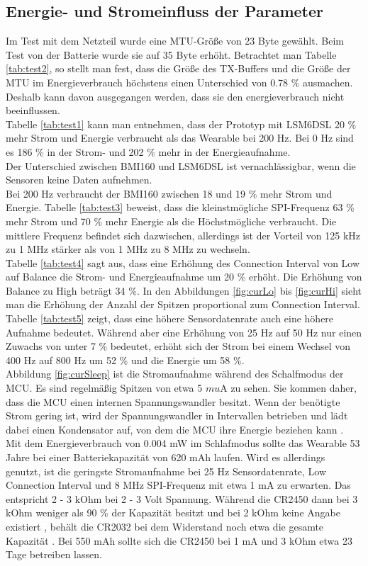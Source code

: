 \subsection{Energie- und Stromeinfluss der Parameter}
Im Test mit dem Netzteil wurde eine MTU-Größe von 23 Byte gewählt.
Beim Test von der Batterie wurde sie auf 35 Byte erhöht.
Betrachtet man Tabelle \ref{tab:test2}, so stellt man fest, dass die Größe des TX-Buffers und die Größe der MTU im Energieverbrauch höchstens einen Unterschied von 0.78 \% ausmachen.
Deshalb kann davon ausgegangen werden, dass sie den energieverbrauch nicht beeinflussen.\\
Tabelle \ref{tab:test1} kann man entnehmen, dass der Prototyp mit LSM6DSL 20 \% mehr Strom und Energie verbraucht als das Wearable bei 200 Hz.
Bei 0 Hz sind es 186 \% in der Strom- und 202 \% mehr in der Energieaufnahme.\\
Der Unterschied zwischen BMI160 und LSM6DSL ist vernachlässigbar, wenn die Sensoren keine Daten aufnehmen.\\
Bei 200 Hz verbraucht der BMI160 zwischen 18 und 19 \% mehr Strom und Energie.
Tabelle \ref{tab:test3} beweist, dass die kleinstmögliche SPI-Frequenz 63 \% mehr Strom und 70 \% mehr Energie als die Höchstmögliche verbraucht.
Die mittlere Frequenz befindet sich dazwischen, allerdings ist der Vorteil von 125 kHz zu 1 MHz stärker als von 1 MHz zu 8 MHz zu wechseln.\\
Tabelle \ref{tab:test4} sagt aus, dass eine Erhöhung des Connection Interval von Low auf Balance die Strom- und Energieaufnahme um 20 \% erhöht.
Die Erhöhung von Balance zu High beträgt 34 \%.
In den Abbildungen \ref{fig:curLo} bis \ref{fig:curHi} sieht man die Erhöhung der Anzahl der Spitzen proportional zum Connection Interval.\\
Tabelle \ref{tab:test5} zeigt, dass eine höhere Sensordatenrate auch eine höhere Aufnahme bedeutet.
Während aber eine Erhöhung von 25 Hz auf 50 Hz nur einen Zuwachs von unter 7 \% bedeutet, erhöht sich der Strom bei einem Wechsel von 400 Hz auf 800 Hz um 52 \% und die Energie um 58 \%.\\
Abbildung \ref{fig:curSleep} ist die Stromaufnahme während des Schalfmodus der MCU.
Es sind regelmäßig Spitzen von etwa 5 $mu$A zu sehen.
Sie kommen daher, dass die MCU einen internen Spannungswandler besitzt.
Wenn der benötigte Strom gering ist, wird der Spannungswandler in Intervallen betrieben und lädt dabei einen Kondensator auf, von dem die MCU ihre Energie beziehen kann \cite{site_refreshMode}.\\
Mit dem Energieverbrauch von 0.004 mW im Schlafmodus sollte das Wearable 53 Jahre bei einer Batteriekapazität von 620 mAh laufen.
Wird es allerdings genutzt, ist die geringste Stromaufnahme bei 25 Hz Sensordatenrate, Low Connection Interval und 8 MHz SPI-Frequenz mit etwa 1 mA zu erwarten.
Das entspricht 2 - 3 kOhm bei 2 - 3 Volt Spannung.
Während die CR2450 dann bei 3 kOhm weniger als 90 \% der Kapazität besitzt und bei 2 kOhm keine Angabe existiert \cite{datasheet_ds6450}, behält die CR2032 bei dem Widerstand noch etwa die gesamte Kapazität \cite{datasheet_ds6032}.
Bei 550 mAh sollte sich die CR2450 bei 1 mA und 3 kOhm etwa 23 Tage betreiben lassen.


